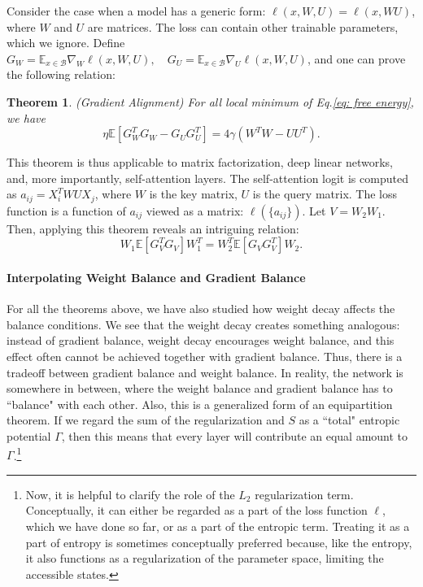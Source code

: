 \documentclass{article}
\theoremstyle{plain}
\newtheorem{theorem}{Theorem}
\newcommand{\E}{\mathbb{E}}
\begin{document}
Consider the case when a model has a generic form: $\ell(x,W, U) = \ell(x,WU)$, where $W$ and $U$ are matrices. The loss can contain other trainable parameters, which we ignore. Define $G_W = \E_{x\in\mathcal{B}}\nabla_W \ell(x,W,U),\quad G_U =\E_{x\in\mathcal{B}}\nabla_U\ell(x,W,U)$, and one can prove the following relation:
\begin{theorem}
\label{theo:attention}
(Gradient Alignment) For all local minimum of Eq.\eqref{eq: free energy}, we have
\begin{equation}
\eta\E[G_W^T G_W-G_U G_U^T]=4\gamma(W^TW-UU^T).
\end{equation}

\end{theorem}

This theorem is thus applicable to matrix factorization, deep linear networks, and, more importantly, self-attention layers. The self-attention logit is computed as $a_{ij} = X_i^T W U X_j$, where $W$ is the key matrix, $U$ is the query matrix. The loss function is a function of $a_{ij}$ viewed as a matrix: $\ell(\{a_{ij}\})$. Let $V = W_2W_1$. Then, applying this theorem reveals an intriguing relation:
\begin{equation}
    W_{1} \E[ G_V^T G_V] W_1^T = W_{2}^T \E[ G_V G_V^T] W_2.
\end{equation}


\paragraph{Interpolating Weight Balance and Gradient Balance}

For all the theorems above, we have also studied how weight decay affects the balance conditions. We see that the weight decay creates something analogous: instead of gradient balance, weight decay encourages weight balance, and this effect often cannot be achieved together with gradient balance. Thus, there is a tradeoff between gradient balance and weight balance. In reality, the network is somewhere in between, where the weight balance and gradient balance has to ``balance" with each other. Also, this is a generalized form of an equipartition theorem. If we regard the sum of the regularization and $S$ as a ``total" entropic potential $\Gamma$, then this means that every layer will contribute an equal amount to $\Gamma$.\footnote{Now, it is helpful to clarify the role of the $L_2$ regularization term. Conceptually, it can either be regarded as a part of the loss function $\ell$, which we have done so far, or as a part of the entropic term. Treating it as a part of entropy is sometimes conceptually preferred because, like the entropy, it also functions as a regularization of the parameter space, limiting the accessible states.}
\end{document}
